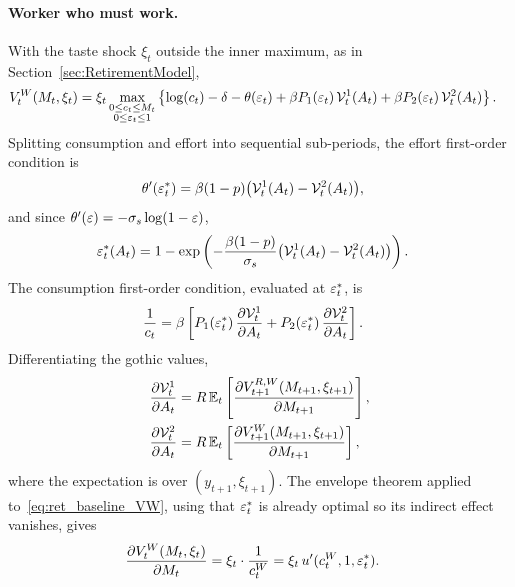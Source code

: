 \paragraph{Worker who must work.}
With the taste shock $\xi_t$ outside the inner maximum, as in Section~\ref{sec:RetirementModel},
\begin{align}
	V_t^{W}(M_t,\xi_t)
	&= \xi_t\max_{\substack{0\le c_t\le M_t\\ 0\le\varepsilon_t\le 1}}
	\left\{
		\log(c_t)-\delta-\theta(\varepsilon_t)
		+\beta P_1(\varepsilon_t)\,\mathcal{V}_t^{1}(A_t)
		+\beta P_2(\varepsilon_t)\,\mathcal{V}_t^{2}(A_t)
	\right\}.
	\label{eq:ret_baseline_VW}
\end{align}
Splitting consumption and effort into sequential sub-periods, the effort first-order condition is
\begin{align}
	\theta'(\varepsilon_t^{\ast})
	&= \beta(1-p)\bigl(\mathcal{V}_t^{1}(A_t)-\mathcal{V}_t^{2}(A_t)\bigr),
\end{align}
and since $\theta'(\varepsilon)=-\sigma_s\log(1-\varepsilon)$,
\begin{align}
	\varepsilon_t^{\ast}(A_t)
	&= 1-\exp\left(
		-\frac{\beta(1-p)}{\sigma_s}
		\bigl(\mathcal{V}_t^{1}(A_t)-\mathcal{V}_t^{2}(A_t)\bigr)
	\right).
	\label{eq:ret_baseline_effort}
\end{align}
The consumption first-order condition, evaluated at $\varepsilon_t^{\ast}$, is
\begin{align}
	\frac{1}{c_t}
	&= \beta\left[
		P_1(\varepsilon_t^{\ast})\,\frac{\partial\mathcal{V}_t^{1}}{\partial A_t}
		+P_2(\varepsilon_t^{\ast})\,\frac{\partial\mathcal{V}_t^{2}}{\partial A_t}
	\right].
	\label{eq:ret_baseline_foc_c}
\end{align}
Differentiating the gothic values,
\begin{align}
	\frac{\partial\mathcal{V}_t^{1}}{\partial A_t}
	&= R\,\mathbb{E}_t\left[
		\frac{\partial V_{t+1}^{R,W}(M_{t+1},\xi_{t+1})}{\partial M_{t+1}}
	\right],
	\\
	\frac{\partial\mathcal{V}_t^{2}}{\partial A_t}
	&= R\,\mathbb{E}_t\left[
		\frac{\partial V_{t+1}^{W}(M_{t+1},\xi_{t+1})}{\partial M_{t+1}}
	\right],
\end{align}
where the expectation is over $(y_{t+1},\xi_{t+1})$. The envelope theorem applied to~\eqref{eq:ret_baseline_VW}, using that $\varepsilon_t^{\ast}$ is already optimal so its indirect effect vanishes, gives
\begin{align}
	\frac{\partial V_t^{W}(M_t,\xi_t)}{\partial M_t}
	&= \xi_t\cdot\frac{1}{c_t^{W}}
	= \xi_t\,u'(c_t^{W},1,\varepsilon_t^{\ast}).
	\label{eq:ret_baseline_env_W}
\end{align}
